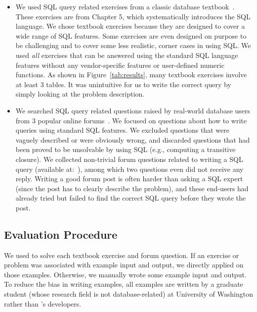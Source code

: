 \begin{itemize}
\item We used \allex SQL query related exercises
from a classic database textbook~\cite{cowbook}.
These exercises are from Chapter 5, which systematically
introduces the SQL language. We chose textbook exercises because they
are designed to
cover a wide range of SQL features. Some exercises
are even designed on purpose to be challenging and to cover some less realistic,
corner cases in using SQL. 
We used \textit{all} exercises that can be answered using the standard
SQL language features without any vendor-specific
features or user-defined numeric functions.
As shown in Figure~\ref{tab:results},
many textbook exercises involve at least 3 tables. It was unintuitive
for us to write the correct query by simply looking at the problem
description.

\item We searched SQL query related questions raised by real-world
database users from 3 popular online forums~\cite{stackoverflow,
tutorialized, dbjournal}.
We focused on questions about how to write queries
using standard SQL features.
We excluded questions that were vaguely described or were obviously
wrong, and discarded questions that had been proved
to be unsolvable by using SQL (e.g., computing a
transitive closure).
We collected \pnum non-trivial forum questions related to writing a SQL query
(available at:~\cite{forumq}), among which
two questions even did not receive any reply.
Writing a good forum post is often harder than asking
a SQL expert (since the post has to clearly 
describe the problem), and these end-users had already tried but
failed to find the correct SQL query before they wrote the post.
\end{itemize}



\vspace{-2mm}
\subsection{Evaluation Procedure}
\vspace{-1mm}

We used \ourtool to solve each textbook exercise and forum
question. If an exercise or problem
was associated with example input and output,
we directly applied \ourtool on those examples.
Otherwise, we manually wrote some example input and output.
To reduce the bias in writing
examples, all examples are written by a graduate
student (whose research field is not database-related) at
University of Washington rather than
\ourtool's developers.

